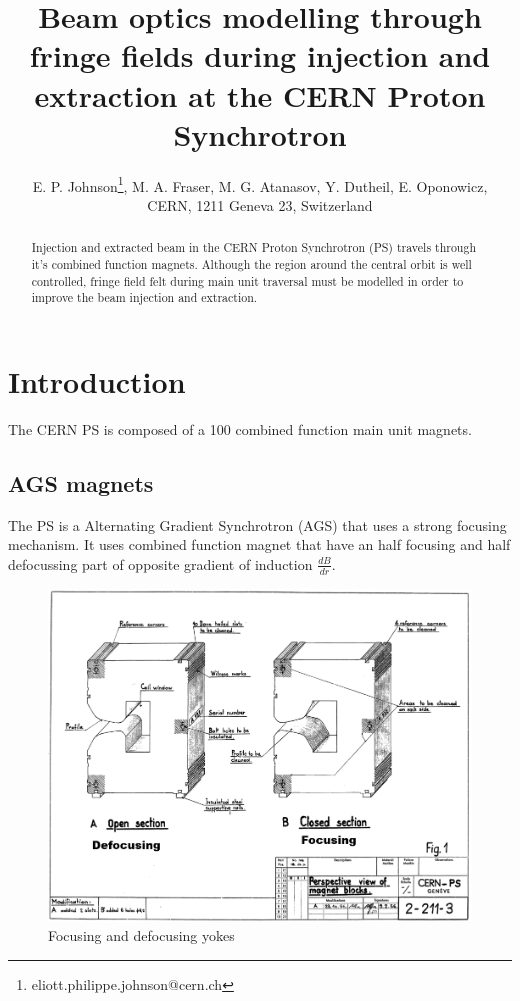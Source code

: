\documentclass[a4paper,
               biblatex,     %
               keeplastbox,   %
               ]{jacow}
\begin{document}
\title{Beam optics modelling through fringe fields during injection and extraction at the CERN Proton Synchrotron}

\author{E. P. Johnson\thanks{eliott.philippe.johnson@cern.ch}, M. A. Fraser, M. G. Atanasov, Y. Dutheil, E. Oponowicz,\\ CERN, 1211 Geneva 23, Switzerland}
	
\maketitle

%
\begin{abstract}
   Injection and extracted beam in the CERN Proton Synchrotron (PS) travels through it's combined function magnets. Although the region around the central orbit is well controlled, fringe field felt during main unit traversal must be modelled in order to improve the beam injection and extraction.
\end{abstract}


\section{Introduction}

The CERN PS is composed of a 100 combined function main unit magnets.

\subsection{AGS magnets}
The PS is a Alternating Gradient Synchrotron (AGS) that uses a strong focusing mechanism. It uses combined function magnet that have an half focusing and half defocussing part of opposite gradient of induction $\frac{dB}{dr}$.

\begin{figure}[!htb]
   \centering
   \includegraphics*[width=1.0\columnwidth]{magnet.png}
   \caption{Focusing and defocusing yokes}
   \label{fig:magnet}
\end{figure}
\end{document}
